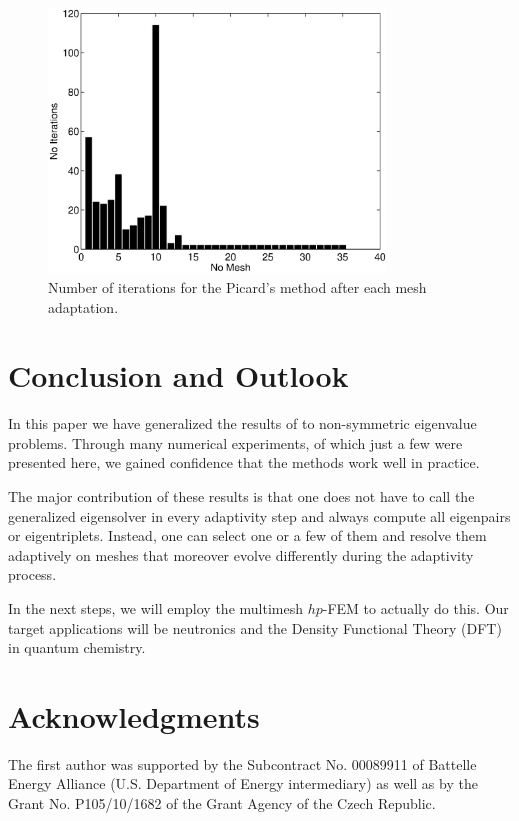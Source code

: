 \documentclass[smallextended]{svjour3}
\begin{document}
\begin{figure}[!ht]
\begin{center}
\includegraphics[width=0.8\textwidth]{its.eps}
\end{center}
\caption{Number of iterations for the Picard's method after each mesh adaptation.}
\label{fig:its}
\end{figure}






\section{Conclusion and Outlook}\label{sec:conclusion}
 
In this paper we have generalized the results of \cite{solin-giani}
to non-symmetric eigenvalue problems. Through many numerical 
experiments, of which just a few were presented here, we gained 
confidence that the methods work well in practice. 

The major contribution of these results is that one does not have to 
call the generalized eigensolver in every adaptivity step and always 
compute all eigenpairs or eigentriplets. Instead, one can select one
or a few of them and resolve them adaptively on meshes that moreover
evolve differently during the adaptivity process. 

In the next steps, we will employ the multimesh $hp$-FEM to actually 
do this. Our target applications will be neutronics and the Density 
Functional Theory (DFT) in quantum chemistry.

\section*{Acknowledgments}
The first author was supported by the Subcontract No. 00089911 of Battelle Energy
Alliance (U.S. Department of Energy intermediary) as well as by the Grant No. 
P105/10/1682 of the Grant Agency of the Czech Republic.
\end{document}
